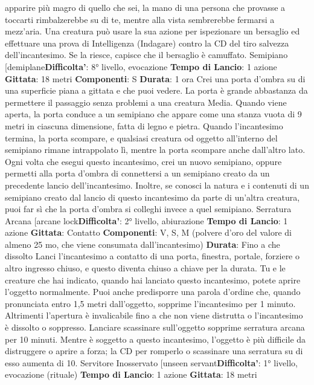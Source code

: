 \begin{multicols}{2}
apparire più magro di quello che sei, la mano di una
persona che provasse a toccarti rimbalzerebbe su di te,
mentre alla vista sembrerebbe fermarsi a mezz’aria.
Una creatura può usare la sua azione per ispezionare
un bersaglio ed effettuare una prova di Intelligenza
(Indagare) contro la CD del tiro salvezza 
dell’incantesimo. Se la riesce, capisce che il bersaglio è
camuffato.
Semipiano
[demiplane\textbf{Difficolta'}:
8° livello, evocazione
\textbf{Tempo di Lancio}: 1 azione
\textbf{Gittata}: 18 metri
\textbf{Componenti}: S
\textbf{Durata}: 1 ora
Crei una porta d’ombra su di una superficie piana a
gittata e che puoi vedere. La porta è grande
abbastanza da permettere il passaggio senza problemi
a una creatura Media. Quando viene aperta, la porta
conduce a un semipiano che appare come una stanza
vuota di 9 metri in ciascuna dimensione, fatta di legno e
pietra. Quando l’incantesimo termina, la porta
scompare, e qualsiasi creatura od oggetto all’interno del
semipiano rimane intrappolato lì, mentre la porta
scompare anche dall’altro lato.
Ogni volta che esegui questo incantesimo, crei un
nuovo semipiano, oppure permetti alla porta d’ombra di
connettersi a un semipiano creato da un precedente
lancio dell’incantesimo. Inoltre, se conosci la natura e i
contenuti di un semipiano creato dal lancio di questo
incantesimo da parte di un’altra creatura, puoi far sì che
la porta d’ombra si colleghi invece a quel semipiano.
Serratura Arcana
[arcane lock\textbf{Difficolta'}:
2° livello, abiurazione
\textbf{Tempo di Lancio}: 1 azione
\textbf{Gittata}: Contatto
\textbf{Componenti}: V, S, M (polvere d’oro del valore di
almeno 25 mo, che viene consumata dall’incantesimo)
\textbf{Durata}: Fino a che dissolto
Lanci l’incantesimo a contatto di una porta, finestra,
portale, forziere o altro ingresso chiuso, e questo
diventa chiuso a chiave per la durata. Tu e le creature
che hai indicato, quando hai lanciato questo
incantesimo, potete aprire l’oggetto normalmente. Puoi
anche predisporre una parola d’ordine che, quando
pronunciata entro 1,5 metri dall’oggetto, sopprime
l’incantesimo per 1 minuto. Altrimenti l’apertura è
invalicabile fino a che non viene distrutta o
l’incantesimo è dissolto o soppresso. Lanciare
scassinare sull’oggetto sopprime serratura arcana per
10 minuti.
Mentre è soggetto a questo incantesimo, l’oggetto è più
difficile da distruggere o aprire a forza; la CD per
romperlo o scassinare una serratura su di esso
aumenta di 10.
Servitore Inosservato
[unseen servant\textbf{Difficolta'}:
1° livello, evocazione (rituale)
\textbf{Tempo di Lancio}: 1 azione
\textbf{Gittata}: 18 metri

\end{multicols}

